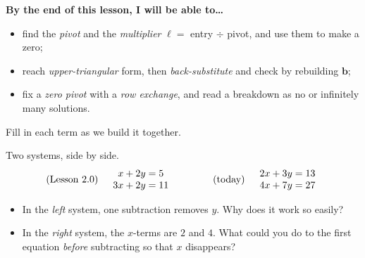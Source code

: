 \documentclass[10pt]{article}
\newcommand{\bb}{\mathbf{b}}
\begin{document}

\vspace{0.12in}

\begin{objectivebox}
\textbf{By the end of this lesson, I will be able to\dots}
\begin{itemize}\setlength{\itemsep}{2pt}
  \item find the \emph{pivot} and the \emph{multiplier} $\ell=$ entry $\div$ pivot, and use them to make a zero;
  \item reach \emph{upper-triangular} form, then \emph{back-substitute} and check by rebuilding $\bb$;
  \item fix a \emph{zero pivot} with a \emph{row exchange}, and read a breakdown as no or infinitely many solutions.
\end{itemize}
\end{objectivebox}

\vspace{0.10in}

\begin{vocabbox}
\small
Fill in each term as we build it together.
\par\vspace{2pt}
\end{vocabbox}

\begin{hookbox}
Two systems, side by side.
\[
  \text{(Lesson 2.0)}\quad
  \begin{array}{r@{}c@{}l} x &{}+ 2y ={}& 5 \\ 3x &{}+ 2y ={}& 11 \end{array}
  \qquad\qquad
  \text{(today)}\quad
  \begin{array}{r@{}c@{}l} 2x &{}+ 3y ={}& 13 \\ 4x &{}+ 7y ={}& 27 \end{array}
\]
\begin{itemize}\setlength{\itemsep}{1pt}
  \item In the \emph{left} system, one subtraction removes $y$. Why does it work so easily?
  \item In the \emph{right} system, the $x$-terms are $2$ and $4$. What could you do to the first
        equation \emph{before} subtracting so that $x$ disappears?
\end{itemize}
\end{hookbox}
\end{document}

